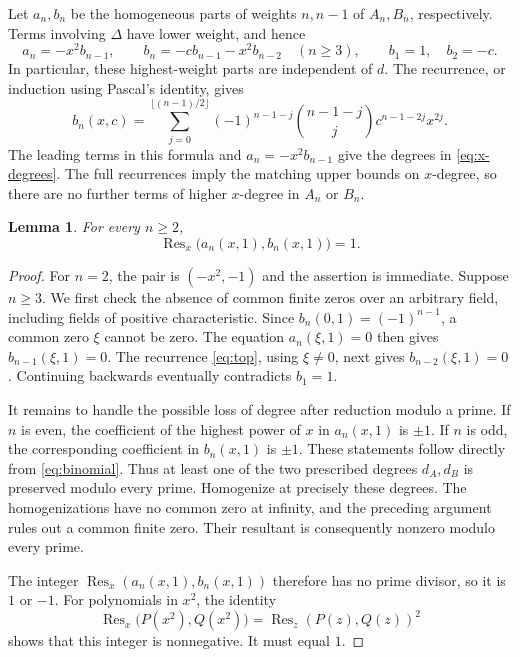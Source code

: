 \documentclass[11pt]{article}
\newtheorem{lemma}[theorem]{Lemma}
\DeclareMathOperator{\Res}{Res}
\begin{document}
Let $a_n,b_n$ be the homogeneous parts of weights $n,n-1$ of $A_n,B_n$,
respectively. Terms involving $\Delta$ have lower weight, and hence
\begin{equation}\label{eq:top}
 a_n=-x^2b_{n-1},\qquad
 b_n=-cb_{n-1}-x^2b_{n-2}\quad(n\ge3),
 \qquad b_1=1,\quad b_2=-c.
\end{equation}
In particular, these highest-weight parts are independent of $d$.
The recurrence, or induction using Pascal's identity, gives
\begin{equation}\label{eq:binomial}
 b_n(x,c)=
 \sum_{j=0}^{\lfloor(n-1)/2\rfloor}
 (-1)^{n-1-j}\binom{n-1-j}{j}c^{n-1-2j}x^{2j}.
\end{equation}
The leading terms in this formula and $a_n=-x^2b_{n-1}$ give the
degrees in \eqref{eq:x-degrees}. The full recurrences imply the matching
upper bounds on $x$-degree, so there are no further terms of higher
$x$-degree in $A_n$ or $B_n$.

\begin{lemma}\label{lem:unit-resultant}
For every $n\ge2$,
\[
 \Res_x\bigl(a_n(x,1),b_n(x,1)\bigr)=1.
\]
\end{lemma}

\begin{proof}
For $n=2$, the pair is $(-x^2,-1)$ and the assertion is immediate.
Suppose $n\ge3$. We first check the absence of common finite zeros
over an arbitrary field, including fields of positive characteristic.
Since $b_n(0,1)=(-1)^{n-1}$, a common zero $\xi$ cannot be zero.
The equation $a_n(\xi,1)=0$ then gives $b_{n-1}(\xi,1)=0$.
The recurrence \eqref{eq:top}, using $\xi\ne0$, next gives
$b_{n-2}(\xi,1)=0$. Continuing backwards eventually contradicts
$b_1=1$.

It remains to handle the possible loss of degree after reduction modulo
a prime. If $n$ is even, the coefficient of the highest power of $x$
in $a_n(x,1)$ is $\pm1$. If $n$ is odd, the corresponding coefficient
in $b_n(x,1)$ is $\pm1$. These statements follow directly from
\eqref{eq:binomial}. Thus at least one of the two prescribed degrees
$d_A,d_B$ is preserved modulo every prime. Homogenize at precisely
these degrees. The homogenizations have no common zero at infinity,
and the preceding argument rules out a common finite zero. Their
resultant is consequently nonzero modulo every prime.

The integer $\Res_x(a_n(x,1),b_n(x,1))$ therefore has no prime divisor,
so it is $1$ or $-1$. For polynomials in $x^2$, the identity
\[
 \Res_x\bigl(P(x^2),Q(x^2)\bigr)
   =\Res_z(P(z),Q(z))^2
\]
shows that this integer is nonnegative. It must equal $1$.
\end{proof}
\end{document}
